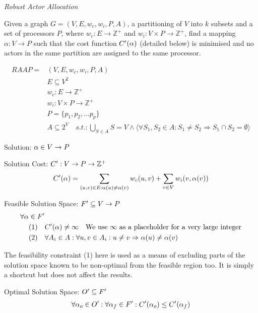\begin{definition}
{\em Robust Actor Allocation}

Given a graph $G=(V,E,w_c,w_i, P, A)$, a partitioning of $V$ into $k$ subsets and a set of processors $P$, where $w_c : E \rightarrow \mathbb{Z}^+$ and $w_i : V \times P \rightarrow \mathbb{Z}^+$, find a mapping $\alpha : V \rightarrow P$ such that
the cost function $C'(\alpha)$ (detailed below) is minimised and no actors in the same partition are assigned to the same processor.

\begin{align}
	\nonumber RAAP = & (V,E,w_c, w_i, P, A)\\
	\nonumber & E \subseteq V^2\\
	\nonumber & w_c : E \rightarrow \mathbb{Z}^+\\
	\nonumber & w_i : V \times P \rightarrow \mathbb{Z}^+\\
	\nonumber & P = \{p_1, p_2, ...p_p\} \\
	\nonumber & A \subseteq 2^V \quad s.t. : \displaystyle\bigcup\limits_{S \in A} S = V \wedge \langle \forall S_1, S_2 \in A : S_1 \neq S_2 \Rightarrow S_1 \cap S_2 = \emptyset \rangle
\end{align}

Solution: $\alpha \in V \rightarrow P$

Solution Cost: $C' : V \rightarrow P \rightarrow \mathbb{Z}^+$
\begin{align}
	\nonumber C'(\alpha) = \displaystyle\sum\limits_{(u,v) \in E : \alpha(u) \neq \alpha(v)} w_c(u,v) + \displaystyle\sum\limits_{v \in V} w_i(v, \alpha(v))
\end{align}

Feasible Solution Space: $F' \subseteq V \rightarrow P$
\begin{align}
	\nonumber \forall \alpha \in F' & \\
	\nonumber \mbox{(1)} \quad & C'(\alpha) \neq \infty \quad \mbox{We use $\infty$ as a placeholder for a very large integer} \\
	\nonumber \mbox{(2)} \quad & \forall A_i \in A : \forall u , v \in A_i : u \neq v \Rightarrow \alpha(u) \neq  \alpha(v)
\end{align}

The feasibility constraint (1) here is used as a means of excluding parts of the solution space known to be non-optimal from the feasible region too.
It is simply a shortcut but does not affect the results.

Optimal Solution Space: $O' \subseteq F'$
\begin{align}
	\nonumber 	\forall \alpha_o \in O' : \forall \alpha_f \in F' : C'(\alpha_o) \leq C'(\alpha_f)
\end{align}

\end{definition}

